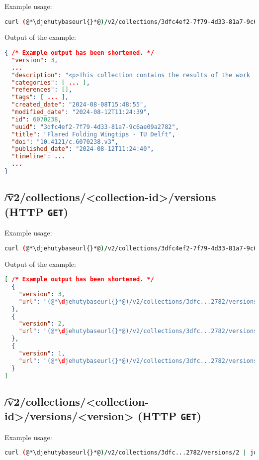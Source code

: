   Example usage:
\begin{lstlisting}[language=bash]
curl (@*\djehutybaseurl{}*@)/v2/collections/3dfc4ef2-7f79-4d33-81a7-9c6ae09a2782 | jq
\end{lstlisting}

  Output of the example:
\begin{lstlisting}[language=JSON]
{ /* Example output has been shortened. */
  "version": 3,
  ...
  "description": "<p>This collection contains the results of the work ...",
  "categories": [ ... ],
  "references": [],
  "tags": [ ... ],
  "created_date": "2024-08-08T15:48:55",
  "modified_date": "2024-08-12T11:24:39",
  "id": 6070238,
  "uuid": "3dfc4ef2-7f79-4d33-81a7-9c6ae09a2782",
  "title": "Flared Folding Wingtips - TU Delft",
  "doi": "10.4121/c.6070238.v3",
  "published_date": "2024-08-12T11:24:40",
  "timeline": ...
  ...
}
\end{lstlisting}

\subsection{\t{/v2/collections/<collection-id>/versions} (HTTP \texttt{GET})}

  Example usage:
\begin{lstlisting}[language=bash]
curl (@*\djehutybaseurl{}*@)/v2/collections/3dfc4ef2-7f79-4d33-81a7-9c6ae09a2782/versions | jq
\end{lstlisting}

  Output of the example:
\begin{lstlisting}[language=JSON]
[ /* Example output has been shortened. */
  {
    "version": 3,
    "url": "(@*\djehutybaseurl{}*@)/v2/collections/3dfc...2782/versions/3"
  },
  {
    "version": 2,
    "url": "(@*\djehutybaseurl{}*@)/v2/collections/3dfc...2782/versions/2"
  },
  {
    "version": 1,
    "url": "(@*\djehutybaseurl{}*@)/v2/collections/3dfc...2782/versions/1"
  }
]
\end{lstlisting}

\subsection{\t{/v2/collections/<collection-id>/versions/<version>} (HTTP \texttt{GET})}

  Example usage:
\begin{lstlisting}[language=bash]
curl (@*\djehutybaseurl{}*@)/v2/collections/3dfc...2782/versions/2 | jq
\end{lstlisting}

